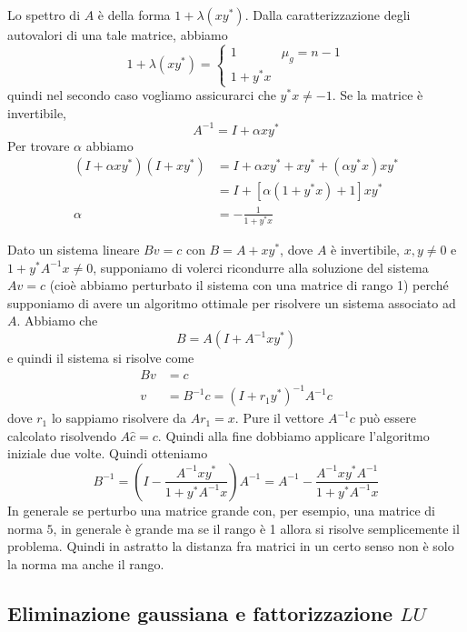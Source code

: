 \documentclass[a4paper]{article}
\begin{document}
\begin{snippetproof}{}
    Lo spettro di \(A\) è della forma
    \(1 + \lambda(xy^*)\). Dalla caratterizzazione degli autovalori di una tale matrice, %
    abbiamo
    \[
        1 + \lambda(xy^*) =
        \begin{cases}
            1 & \mu_g = n - 1 \\
            1 + y^*x
        \end{cases}
    \]
    quindi nel secondo caso vogliamo assicurarci che \(y^*x \neq -1\).
    Se la matrice è invertibile,
    \[
        A^{-1} = I + \alpha xy^*
    \]
    Per trovare \(\alpha\) abbiamo
    \begin{align*}
        (I + \alpha xy^*)(I + xy^*) &= I + \alpha x y^* + xy^* + (\alpha y^* x)xy^* \\
        &= I + \left[\alpha(1 + y^* x) + 1\right]xy^* \\
        \alpha &= -\frac{1}{1 + y^*x}
    \end{align*}
\end{snippetproof}

Dato un sistema lineare \(Bv = c\)
con \(B = A + xy^*\), dove \(A\) è invertibile, \(x,y \neq 0\) e \(1+y^*A^{-1}x\neq 0\),
supponiamo di volerci ricondurre alla soluzione del sistema \(Av = c\)
(cioè abbiamo perturbato il sistema con una matrice di rango 1) perché supponiamo di avere un algoritmo
ottimale per risolvere un sistema associato ad \(A\).
Abbiamo che \[
    B = A(I + A^{-1}xy^*)
\]
e quindi il sistema si risolve come
\begin{align*}
    Bv &= c \\
    v &= B^{-1} c = (I + r_1y^*)^{-1} A^{-1} c
\end{align*}
dove \(r_1\) lo sappiamo risolvere da \(Ar_1 = x\).
Pure il vettore \(A^{-1}c\) può essere calcolato risolvendo \(A\hat c = c\).
Quindi alla fine dobbiamo applicare l'algoritmo iniziale due volte.
Quindi otteniamo
\[
    B^{-1} = \left(
        I - \frac{A^{-1} x y^*}{1 + y^* A^{-1} x}
    \right) A^{-1}
    = A^{-1} - \frac{A^{-1} x y^*A^{-1}}{1 + y^* A^{-1} x}
\]
In generale se perturbo una matrice grande con, per esempio, una matrice di norma \(5\),
in generale è grande ma se il rango è 1 allora si risolve semplicemente il problema.
Quindi in astratto la distanza fra matrici in un certo senso non è solo la norma ma anche il rango.

\subsection{Eliminazione gaussiana e fattorizzazione \(LU\)}
\end{document}
